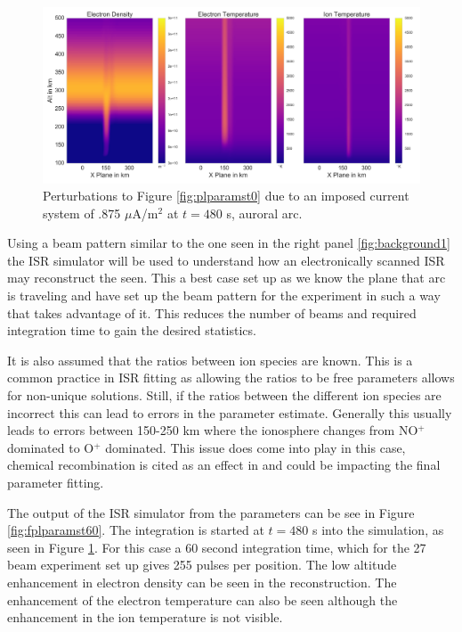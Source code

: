 \documentclass[draft,ras]{agutex}
\begin{document}
\begin{article}
\begin{figure}[!t]
\centering
\includegraphics[width=5in]{0480_input}
\caption{Perturbations to Figure \ref{fig:plparamst0} due to an imposed current system of .875 $\mu$A/m$^2$ at $t=480$ s, auroral arc.}
\label{fig:plparamst60}
\end{figure}

Using a beam pattern similar to the one seen in the right panel \ref{fig:background1} the ISR simulator will be used to understand how an electronically scanned ISR may reconstruct the seen. This a best case set up as we know the plane that arc is traveling and have set up the beam pattern for the experiment in such a way that takes advantage of it. This reduces the number of beams and required integration time to gain the desired statistics. 

It is also assumed that the ratios between ion species are known. This is a common practice in ISR fitting as allowing the ratios to be free parameters allows for non-unique solutions. Still, if the ratios between the different ion species are incorrect this can lead to errors in the parameter estimate. Generally this usually leads to errors between 150-250 km where the ionosphere changes from NO$^+$ dominated to O$^+$ dominated. This issue does come into play in this case, chemical recombination is cited as an effect in \citet{Perry:2015jf} and could be impacting the final parameter fitting.


The output of the ISR simulator from the parameters can be see in Figure \ref{fig:fplparamst60}. The integration is started at $t=480$ s into the simulation, as seen in Figure \ref{fig:plparamst60}. For this case a 60 second integration time, which for the 27 beam experiment set up gives 255 pulses per position. The low altitude enhancement in electron density can be seen in the reconstruction. The enhancement of the electron temperature can also be seen although the enhancement in the ion temperature is not visible.


\end{article}
\end{document}
